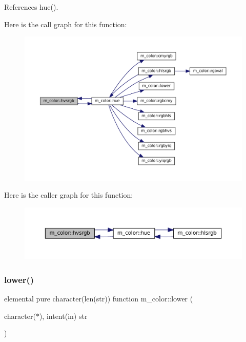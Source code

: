 References hue().

Here is the call graph for this function\+:
\nopagebreak
\begin{figure}[H]
\begin{center}
\leavevmode
\includegraphics[width=350pt]{namespacem__color_a334ec90d94bbfb9a4c08c5f9efdb8c47_cgraph}
\end{center}
\end{figure}
Here is the caller graph for this function\+:
\nopagebreak
\begin{figure}[H]
\begin{center}
\leavevmode
\includegraphics[width=350pt]{namespacem__color_a334ec90d94bbfb9a4c08c5f9efdb8c47_icgraph}
\end{center}
\end{figure}
\mbox{\label{namespacem__color_a704e93b42d777a827ec557c92d2dd7dc}} 
\subsubsection{\texorpdfstring{lower()}{lower()}}
{\footnotesize\ttfamily elemental pure character(len(str)) function m\+\_\+color\+::lower (\begin{DoxyParamCaption}\item[{character($\ast$), intent(in)}]{str }\end{DoxyParamCaption})\hspace{0.3cm}{\ttfamily [private]}}

